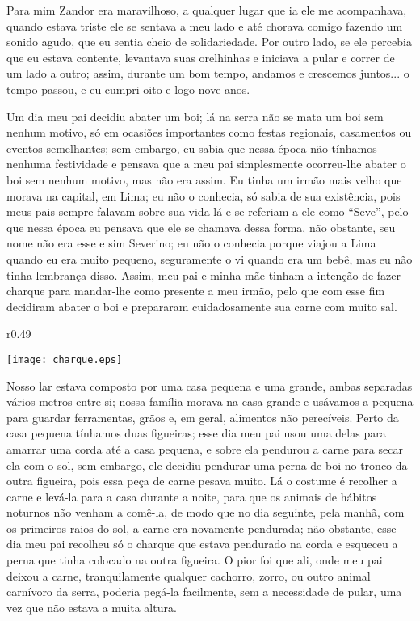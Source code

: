 Para mim Zandor era maravilhoso, a qualquer lugar que ia ele me acompanhava, quando estava triste ele se sentava a meu lado e até chorava comigo fazendo um sonido agudo, que eu sentia cheio de solidariedade. 
Por outro lado, se ele percebia que eu estava contente, levantava suas orelhinhas e iniciava a pular e correr de um lado a outro; assim, durante um bom tempo, andamos e crescemos juntos... o tempo passou, e eu cumpri oito e logo nove anos.

Um dia meu pai decidiu abater um boi; lá na serra não se mata um boi sem nenhum motivo, só em ocasiões importantes como festas regionais, casamentos ou eventos semelhantes; sem embargo, eu sabia que nessa época não tínhamos nenhuma festividade e pensava que a meu pai simplesmente ocorreu-lhe abater o boi sem nenhum motivo, mas não era assim. 
Eu tinha um irmão mais velho que morava na capital, em Lima; eu não o conhecia, só sabia de sua existência, pois meus pais sempre falavam sobre sua vida lá e se referiam a ele como ``Seve'', pelo que nessa época eu pensava que ele se chamava dessa forma, não obstante, seu nome não era esse e sim Severino; eu não o conhecia porque viajou a Lima quando eu era muito pequeno, seguramente o vi quando era um bebê, mas eu não tinha lembrança disso. 
Assim, meu pai e minha mãe tinham a intenção de fazer charque para mandar-lhe como presente a meu irmão, pelo que com esse fim decidiram abater o boi e prepararam cuidadosamente sua carne com muito sal.

\begin{wrapfigure}{r}{0.49\textwidth}
  \begin{center}
  \vspace{-20pt}
    \texttt{[image: charque.eps]}
  \end{center}
  \vspace{-20pt}
\end{wrapfigure}
Nosso lar estava composto por uma casa pequena e uma grande, ambas separadas vários metros entre si; nossa família morava na casa grande e usávamos a pequena para guardar ferramentas, grãos e, em geral, alimentos não perecíveis. Perto da casa pequena tínhamos duas figueiras; esse dia meu pai usou uma delas para amarrar uma corda até a casa pequena, e sobre ela pendurou a carne para secar ela com o sol, sem embargo, ele decidiu pendurar uma perna de boi no tronco da outra figueira, pois essa peça de carne pesava muito.
Lá o costume é recolher a carne e levá-la para a casa durante a noite, para que os animais de hábitos noturnos não venham a comê-la, de modo que no dia seguinte, pela manhã, com os primeiros raios do sol, a carne era novamente pendurada; não obstante, esse dia meu pai recolheu só o charque que estava pendurado na corda e esqueceu a perna que tinha colocado na outra figueira. 
O pior foi que ali, onde meu pai deixou a carne, tranquilamente qualquer cachorro, zorro, ou outro animal carnívoro da serra, poderia pegá-la facilmente, sem a necessidade de pular, uma vez que não estava a muita altura.

